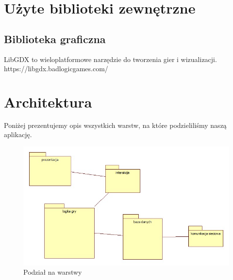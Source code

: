 \documentclass[a4paper, 11pt]{article}
\begin{document}
	
	\section{Użyte biblioteki zewnętrzne}
	\subsection{Biblioteka graficzna}
	LibGDX to wieloplatformowe narzędzie do tworzenia gier i wizualizacji.\\
	 https://libgdx.badlogicgames.com/
	\section{Architektura}
	\indent
	
	Poniżej prezentujemy opis wszystkich warstw, na które podzieliliśmy naszą aplikację.
	\begin{figure}[H]%
		\includegraphics[scale=0.5]{uml/main.jpg}\caption{Podział na warstwy}
	\end{figure}
\end{document}
